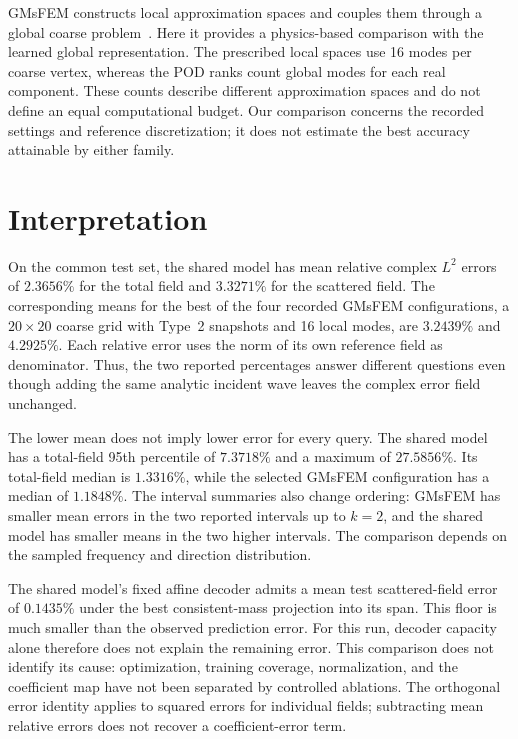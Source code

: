 GMsFEM constructs local approximation spaces and couples them through a global coarse problem~\cite{efendiev2013}. Here it provides a physics-based comparison with the learned global representation. The prescribed local spaces use 16 modes per coarse vertex, whereas the POD ranks count global modes for each real component. These counts describe different approximation spaces and do not define an equal computational budget. Our comparison concerns the recorded settings and reference discretization; it does not estimate the best accuracy attainable by either family.

\section{Interpretation}
On the common test set, the shared model has mean relative complex $L^2$ errors of $2.3656\%$ for the total field and $3.3271\%$ for the scattered field. The corresponding means for the best of the four recorded GMsFEM configurations, a $20\times20$ coarse grid with Type~2 snapshots and 16 local modes, are $3.2439\%$ and $4.2925\%$. Each relative error uses the norm of its own reference field as denominator. Thus, the two reported percentages answer different questions even though adding the same analytic incident wave leaves the complex error field unchanged.

The lower mean does not imply lower error for every query. The shared model has a total-field 95th percentile of $7.3718\%$ and a maximum of $27.5856\%$. Its total-field median is $1.3316\%$, while the selected GMsFEM configuration has a median of $1.1848\%$. The interval summaries also change ordering: GMsFEM has smaller mean errors in the two reported intervals up to $k=2$, and the shared model has smaller means in the two higher intervals. The comparison depends on the sampled frequency and direction distribution.

The shared model's fixed affine decoder admits a mean test scattered-field error of $0.1435\%$ under the best consistent-mass projection into its span. This floor is much smaller than the observed prediction error. For this run, decoder capacity alone therefore does not explain the remaining error. This comparison does not identify its cause: optimization, training coverage, normalization, and the coefficient map have not been separated by controlled ablations. The orthogonal error identity applies to squared errors for individual fields; subtracting mean relative errors does not recover a coefficient-error term.

